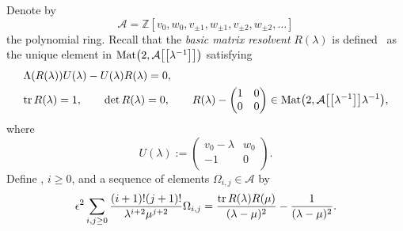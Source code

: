 \documentclass[pdftex]{sigma}
\newcommand{\e}{\epsilon}
\newcommand{\ZZ}{\mathbb{Z}}
\newcommand{\tr}{{\rm tr}}
\numberwithin{equation}{section}
\begin{document}
Denote by
\[
\mathcal{A}=\ZZ[v_0, w_0, v_{\pm1}, w_{\pm 1}, v_{\pm 2}, w_{\pm 2}, \dots]
\]
the polynomial ring.
Recall that the {\it basic matrix resolvent} $R(\lambda)$ is defined~\cite{DY} as
the unique element in ${\rm Mat}\bigl(2,\mathcal{A}\bigl[\bigl[\lambda^{-1}\bigr]\bigr]\bigr)$ satisfying
\begin{align*}
& \Lambda(R(\lambda)) U(\lambda) - U(\lambda) R(\lambda) =0,\\
& \tr \, R(\lambda) =1, \qquad \det R(\lambda)=0,\qquad
 R(\lambda) - \begin{pmatrix} 1 & 0 \\ 0 & 0 \\ \end{pmatrix} \in {\rm Mat}\bigl(2,\mathcal{A}\bigl[\bigl[\lambda^{-1}\bigr]\bigr]\lambda^{-1}\bigr), %
\end{align*}
where
\[
U(\lambda) := \begin{pmatrix} v_0-\lambda & w_0 \\ -1 & 0 \\ \end{pmatrix}.
\]
Define , $i\geq0$, and
a sequence of elements $\Omega_{i,j} \in \mathcal{A}$ by
\[
\e^2\sum_{i,j\geq0} \frac{(i+1)!(j+1)!}{\lambda^{i+2} \mu^{j+2}}\Omega_{i,j} = \frac{\tr \, R(\lambda)R(\mu)}{(\lambda-\mu)^2} - \frac{1}{(\lambda-\mu)^2}.
\]
\end{document}
